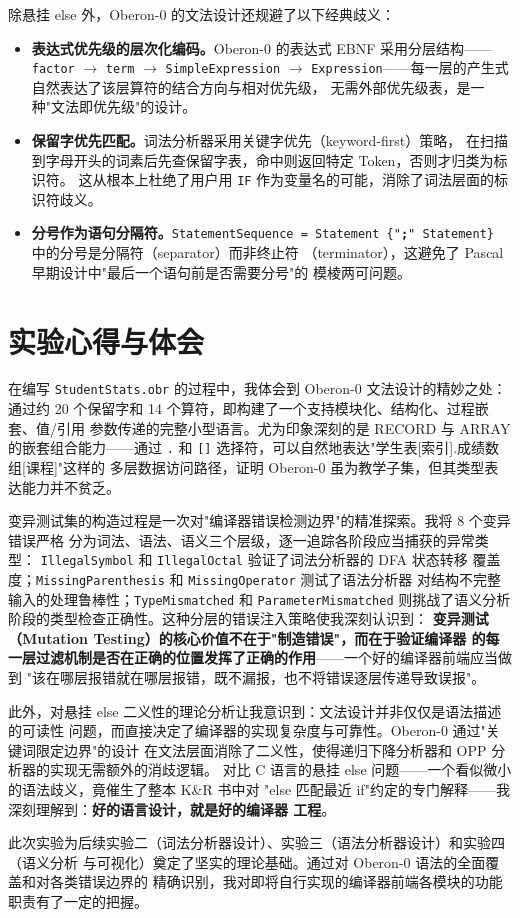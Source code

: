 \documentclass[a4paper]{article}
\begin{document}
除悬挂 else 外，Oberon-0 的文法设计还规避了以下经典歧义：

\begin{itemize}
    \item \textbf{表达式优先级的层次化编码。}Oberon-0 的表达式 EBNF 采用分层结构——
    \texttt{factor} $\to$ \texttt{term} $\to$ \texttt{SimpleExpression} $\to$
    \texttt{Expression}——每一层的产生式自然表达了该层算符的结合方向与相对优先级，
    无需外部优先级表，是一种"文法即优先级"的设计。

    \item \textbf{保留字优先匹配。}词法分析器采用关键字优先（keyword-first）策略，
    在扫描到字母开头的词素后先查保留字表，命中则返回特定 Token，否则才归类为标识符。
    这从根本上杜绝了用户用 \texttt{IF} 作为变量名的可能，消除了词法层面的标识符歧义。

    \item \textbf{分号作为语句分隔符。}\texttt{StatementSequence = Statement
    \{"\textbf{;}" Statement\}} 中的分号是分隔符（separator）而非终止符
    （terminator），这避免了 Pascal 早期设计中"最后一个语句前是否需要分号"的
    模棱两可问题。
\end{itemize}

\section{实验心得与体会}

在编写 \texttt{StudentStats.obr} 的过程中，我体会到 Oberon-0 文法设计的精妙之处：
通过约 20 个保留字和 14 个算符，即构建了一个支持模块化、结构化、过程嵌套、值/引用
参数传递的完整小型语言。尤为印象深刻的是 RECORD 与 ARRAY 的嵌套组合能力——通过
\texttt{.} 和 \texttt{[]} 选择符，可以自然地表达"学生表[索引].成绩数组[课程]"这样的
多层数据访问路径，证明 Oberon-0 虽为教学子集，但其类型表达能力并不贫乏。

变异测试集的构造过程是一次对"编译器错误检测边界"的精准探索。我将 8 个变异错误严格
分为词法、语法、语义三个层级，逐一追踪各阶段应当捕获的异常类型：
\texttt{IllegalSymbol} 和 \texttt{IllegalOctal} 验证了词法分析器的 DFA 状态转移
覆盖度；\texttt{MissingParenthesis} 和 \texttt{MissingOperator} 测试了语法分析器
对结构不完整输入的处理鲁棒性；\texttt{TypeMismatched} 和 \texttt{ParameterMismatched}
则挑战了语义分析阶段的类型检查正确性。这种分层的错误注入策略使我深刻认识到：
\textbf{变异测试（Mutation Testing）的核心价值不在于"制造错误"，而在于验证编译器
的每一层过滤机制是否在正确的位置发挥了正确的作用}——一个好的编译器前端应当做到
"该在哪层报错就在哪层报错，既不漏报，也不将错误逐层传递导致误报"。

此外，对悬挂 else 二义性的理论分析让我意识到：文法设计并非仅仅是语法描述的可读性
问题，而直接决定了编译器的实现复杂度与可靠性。Oberon-0 通过"关键词限定边界"的设计
在文法层面消除了二义性，使得递归下降分析器和 OPP 分析器的实现无需额外的消歧逻辑。
对比 C 语言的悬挂 else 问题——一个看似微小的语法歧义，竟催生了整本 K\&R 书中对
"else 匹配最近 if"约定的专门解释——我深刻理解到：\textbf{好的语言设计，就是好的编译器
工程}。

此次实验为后续实验二（词法分析器设计）、实验三（语法分析器设计）和实验四（语义分析
与可视化）奠定了坚实的理论基础。通过对 Oberon-0 语法的全面覆盖和对各类错误边界的
精确识别，我对即将自行实现的编译器前端各模块的功能职责有了一定的把握。
\end{document}

